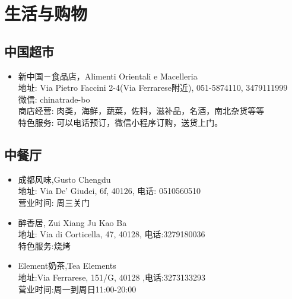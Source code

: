 \chapter{生活与购物}              



\section{中国超市}
\begin{itemize}
\item 新中国－食品店，Alimenti Orientali e Macelleria\\
地址: Via Pietro Faccini 2-4(Via Ferrarese附近), 051-5874110, 3479111999\\
微信: chinatrade-bo\\
商店经营: 肉类，海鲜，蔬菜，佐料，滋补品，名酒，南北杂货等等\\
特色服务: 可以电话预订，微信小程序订购，送货上门。
\end{itemize}

\section{中餐厅}
\begin{itemize}
\item 成都风味,Gusto Chengdu\\
地址: Via De' Giudei, 6f, 40126, 电话: 0510560510 \\
营业时间: 周三关门\\

\item 醉香居, Zui Xiang Ju Kao Ba\\
地址: Via di Corticella, 47, 40128, 电话:3279180036\\
特色服务:烧烤\\

\item Element奶茶,Tea Elements\\
地址:Via Ferrarese, 151/G, 40128 ,电话:3273133293\\
营业时间:周一到周日11:00-20:00
\end{itemize}

